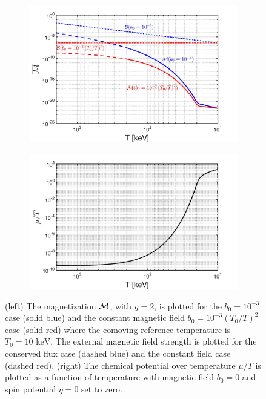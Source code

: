 \documentclass[a4paper]{article}
\newcommand*{\keV}{\text{ keV}}
\begin{document}
\begin{figure}[ht]
    \centering
    \begin{subfigure}{0.49\textwidth}
        \includegraphics[width=\textwidth]{Magnetization_Hc_constant.jpg}
    \end{subfigure}
    \hfill
    \begin{subfigure}{0.49\textwidth}
        \includegraphics[width=\textwidth]{ChemicalPotential_new.jpg}
    \end{subfigure}
    \caption{(left) The magnetization ${\cal M}$, with $g=2$, is plotted for the $b_{0}=10^{-3}$ case (solid blue) and the constant magnetic field $b_{0}=10^{-3}(T_{0}/T)^{2}$ case (solid red) where the comoving reference temperature is $T_{0}=10\keV$. The external magnetic field strength is plotted for the conserved flux case (dashed blue) and the constant field case (dashed red). (right) The chemical potential over temperature $\mu/T$ is plotted as a function of temperature with magnetic field $b_{0}=0$ and spin potential $\eta=0$ set to zero.}
    \label{fig:paireffect}
\end{figure}
\end{document}
